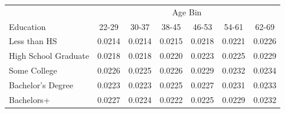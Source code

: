 \begin{tabular}{lcccccc}
\hline\hline
 & \multicolumn{6}{c}{Age Bin} \\
Education & 22-29 & 30-37 & 38-45 & 46-53 & 54-61 & 62-69 \\
\hline
Less than HS&0.0214&0.0214&0.0215&0.0218&0.0221&0.0226\\
High School Graduate&0.0218&0.0218&0.0220&0.0223&0.0225&0.0229\\
Some College&0.0226&0.0225&0.0226&0.0229&0.0232&0.0234\\
Bachelor's Degree&0.0223&0.0223&0.0225&0.0227&0.0231&0.0233\\
Bachelors+&0.0227&0.0224&0.0222&0.0225&0.0229&0.0232\\
\hline\hline
\end{tabular}
